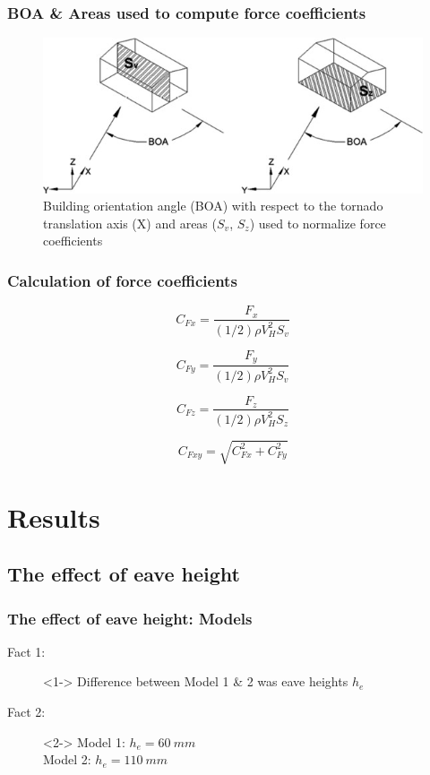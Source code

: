 \documentclass{beamer}
\begin{document}
\begin{frame}
	\frametitle{BOA \& Areas used to compute force coefficients}
	\begin{figure}
	\centering
	\caption{Building orientation angle (BOA) with respect to the tornado translation axis (X) and areas ($S_v$, $S_z$) used to normalize force coefficients}
		\includegraphics[width=\textwidth]{./fig/3.jpg}
	\end{figure}
	
	
\end{frame}

\begin{frame}
	\frametitle{Calculation of force coefficients}
	\begin{equation}
		C_{Fx}=\frac{F_x}{(1/2)\rho V_H^2 S_v}
	\end{equation}
	
	\begin{equation}
		C_{Fy}=\frac{F_y}{(1/2)\rho V_H^2 S_v}
	\end{equation}
	
	\begin{equation}
		C_{Fz}=\frac{F_z}{(1/2)\rho V_H^2 S_z}
	\end{equation}
	
	\begin{equation}
		C_{Fxy}=\sqrt{C_{Fx}^2+C_{Fy}^2}
	\end{equation}
\end{frame}

\section{Results}
\subsection{The effect of eave height}
\begin{frame}
	\frametitle{The effect of eave height: Models}
	\begin{description}
		\item[Fact 1: ]<1-> Difference between Model 1 \& 2 was \alert{eave heights $h_e$}
		\item[Fact 2: ]<2-> Model 1:  $h_e=\SI{60}{mm}$ \\
		                                         Model 2:  $h_e=\SI{110}{mm}$
	\end{description}
\end{frame}
\end{document}

